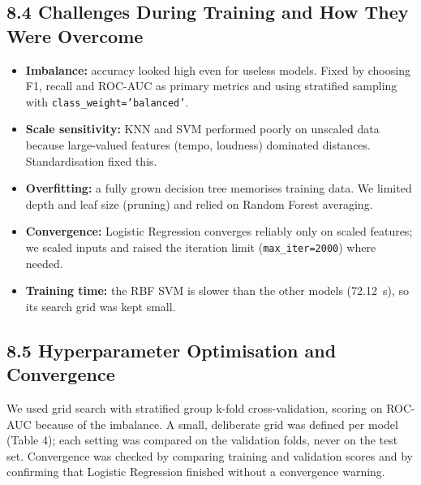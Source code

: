 \documentclass[11pt,a4paper]{article}
\begin{document}
\subsection*{8.4 Challenges During Training and How They Were Overcome}
\begin{itemize}
  \item \textbf{Imbalance:} accuracy looked high even for useless models. Fixed by choosing F1, recall and ROC-AUC as primary metrics and using stratified sampling with \texttt{class\_weight='balanced'}.
  \item \textbf{Scale sensitivity:} KNN and SVM performed poorly on unscaled data because large-valued features (tempo, loudness) dominated distances. Standardisation fixed this.
  \item \textbf{Overfitting:} a fully grown decision tree memorises training data. We limited depth and leaf size (pruning) and relied on Random Forest averaging.
  \item \textbf{Convergence:} Logistic Regression converges reliably only on scaled features; we scaled inputs and raised the iteration limit (\texttt{max\_iter=2000}) where needed.
  \item \textbf{Training time:} the RBF SVM is slower than the other models (72.12~s), so its search grid was kept small.
\end{itemize}

\subsection*{8.5 Hyperparameter Optimisation and Convergence}
We used grid search with stratified group k-fold cross-validation, scoring on ROC-AUC because of the imbalance. A small, deliberate grid was defined per model (Table 4); each setting was compared on the validation folds, never on the test set. Convergence was checked by comparing training and validation scores and by confirming that Logistic Regression finished without a convergence warning.
\end{document}
